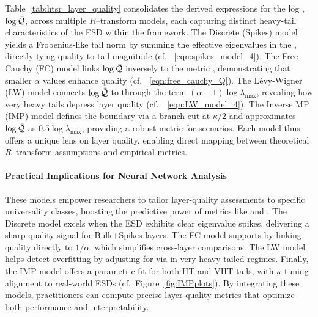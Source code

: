
Table~\ref{tab:htsr_layer_quality} consolidates the derived expressions for the log \LayerQuality, \(\log\bar{\mathcal{Q}}\), across multiple \(R\)–transform models, each capturing distinct heavy-tail characteristics of the ESD within the \SETOL framework. The Discrete (Spikes) model yields a Frobenius-like tail norm by summing the effective eigenvalues in the \ECS, directly tying quality to tail magnitude (cf. \EQN~\ref{eqn:spikes_model_4}). The Free Cauchy (FC) model links \(\log\bar{\mathcal{Q}}\) inversely to the \HTSR metric \ALPHA, demonstrating that smaller \(\alpha\) values enhance quality (cf. \EQN~\ref{eqn:free_cauchy_Q}). The L\'evy-Wigner (LW) model connects \(\log\bar{\mathcal{Q}}\) to \ALPHAHAT through the term \((\alpha-1)\log\lambda_{\max}\), revealing how very heavy tails depress layer quality (cf.\ \EQN~\ref{eqn:LW_model_4}). The Inverse MP (IMP) model defines the \ECS boundary via a branch cut at \(\kappa/2\) and approximates \(\log\bar{\mathcal{Q}}\) as \(0.5\log\lambda_{\max}\), providing a robust metric for \IdealLearning scenarios. Each model thus offers a unique lens on layer quality, enabling direct mapping between theoretical \(R\)–transform assumptions and empirical \WW metrics.

\paragraph{Practical Implications for Neural Network Analysis}
These models empower researchers to tailor layer-quality assessments to specific \HTSR universality classes, boosting the predictive power of \WW metrics like \ALPHA and \ALPHAHAT. The Discrete model excels when the ESD exhibits clear eigenvalue spikes, delivering a sharp quality signal for Bulk$+$Spikes layers. The FC model supports \IdealLearning by linking quality directly to \(1/\alpha\), which simplifies cross-layer comparisons. The LW model helps detect overfitting by adjusting for \CorrelationTraps via \ALPHAHAT in very heavy-tailed regimes. Finally, the IMP model offers a parametric fit for both HT and VHT tails, with \(\kappa\) tuning alignment to real-world ESDs (cf.\ Figure~\ref{fig:IMPplots}). By integrating these models, practitioners can compute precise layer-quality metrics that optimize both performance and interpretability.
